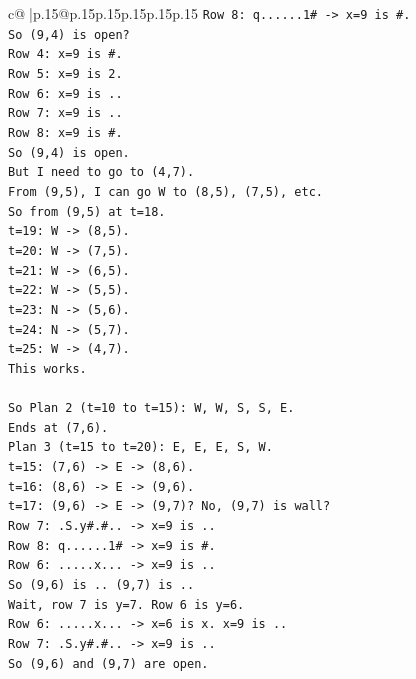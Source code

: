 \documentclass{article}
\begin{document}
{\begin{supertabular}{c@{$\;$}|p{.15\linewidth}@{}p{.15\linewidth}p{.15\linewidth}p{.15\linewidth}p{.15\linewidth}p{.15\linewidth}}
{{{\texttt{Row 8: q......1\# {-}> x=9 is \#.} \\
\texttt{So (9,4) is open?} \\
\texttt{Row 4: x=9 is \#.} \\
\texttt{Row 5: x=9 is 2.} \\
\texttt{Row 6: x=9 is ..} \\
\texttt{Row 7: x=9 is ..} \\
\texttt{Row 8: x=9 is \#.} \\
\texttt{So (9,4) is open.} \\
\texttt{But I need to go to (4,7).} \\
\texttt{From (9,5), I can go W to (8,5), (7,5), etc.} \\
\texttt{So from (9,5) at t=18.} \\
\texttt{t=19: W {-}> (8,5).} \\
\texttt{t=20: W {-}> (7,5).} \\
\texttt{t=21: W {-}> (6,5).} \\
\texttt{t=22: W {-}> (5,5).} \\
\texttt{t=23: N {-}> (5,6).} \\
\texttt{t=24: N {-}> (5,7).} \\
\texttt{t=25: W {-}> (4,7).} \\
\texttt{This works.} \\
\\ 
\texttt{So Plan 2 (t=10 to t=15): W, W, S, S, E.} \\
\texttt{Ends at (7,6).} \\
\texttt{Plan 3 (t=15 to t=20): E, E, E, S, W.} \\
\texttt{t=15: (7,6) {-}> E {-}> (8,6).} \\
\texttt{t=16: (8,6) {-}> E {-}> (9,6).} \\
\texttt{t=17: (9,6) {-}> E {-}> (9,7)? No, (9,7) is wall?} \\
\texttt{Row 7: .S.y\#.\#.. {-}> x=9 is ..} \\
\texttt{Row 8: q......1\# {-}> x=9 is \#.} \\
\texttt{Row 6: .....x... {-}> x=9 is ..} \\
\texttt{So (9,6) is .. (9,7) is ..} \\
\texttt{Wait, row 7 is y=7. Row 6 is y=6.} \\
\texttt{Row 6: .....x... {-}> x=6 is x. x=9 is ..} \\
\texttt{Row 7: .S.y\#.\#.. {-}> x=9 is ..} \\
\texttt{So (9,6) and (9,7) are open.} \\
}}}
\end{supertabular}}
\end{document}
